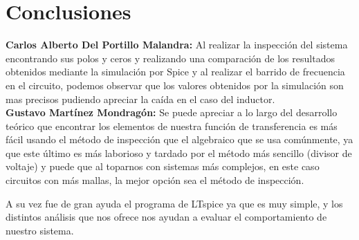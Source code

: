 \documentclass{article}
\begin{document}
\section{Conclusiones}
\textbf{Carlos Alberto Del Portillo Malandra:} 
Al realizar la inspección del sistema encontrando sus polos y ceros y realizando una comparación de los resultados obtenidos mediante la simulación por Spice y al realizar el barrido de frecuencia en el circuito, podemos observar que los valores obtenidos por la simulación son mas precisos pudiendo apreciar la caída en el caso del inductor.\\

\textbf{Gustavo Martínez Mondragón:} 
Se puede apreciar a lo largo del desarrollo teórico que encontrar los elementos de nuestra función de transferencia es más fácil usando el método de inspección que el algebraico que se usa comúnmente, ya que este último es más laborioso y tardado por el método más sencillo (divisor de voltaje) y puede que al toparnos con sistemas más complejos, en este caso circuitos con más mallas, la mejor opción sea el método de inspección.

A su vez fue de gran ayuda el programa de LTspice ya que es muy simple, y los distintos análisis que nos ofrece nos ayudan a evaluar el comportamiento de nuestro sistema.
	
	
\end{document}

